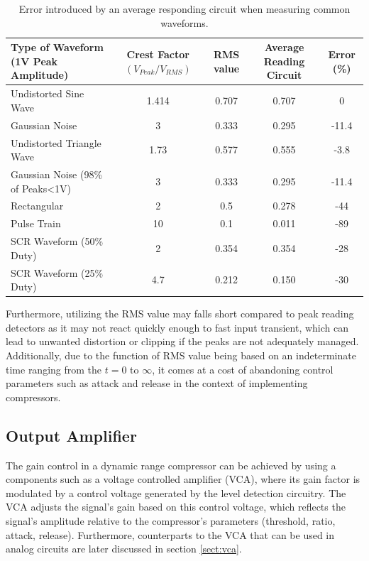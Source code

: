 \documentclass[10pt]{article}
\begin{document}
\begin{multicols*}{2}
                        \begin{table}[!th]
                            \centering
                            \begin{tabularx}{\textwidth}{|l*{4}{|C}|}
                                \hline
                                Type of Waveform (1V Peak Amplitude) & Crest Factor $(V_{Peak}/V_{RMS})$ & RMS value & Average Reading Circuit & Error (\%) \\ \hline
                                Undistorted Sine Wave & 1.414 & 0.707 & 0.707 & 0 \\    \hline
                                Gaussian Noise & 3 & 0.333 & 0.295 & -11.4 \\   \hline
                                Undistorted Triangle Wave & 1.73 & 0.577 & 0.555 & -3.8 \\   \hline
                                Gaussian Noise (98\% of Peaks<1V) & 3 & 0.333 & 0.295 & -11.4 \\    \hline
                                Rectangular & 2 & 0.5 & 0.278 & -44 \\    \hline
                                Pulse Train & 10 & 0.1 & 0.011 & -89 \\    \hline
                                SCR Waveform (50\% Duty) & 2 & 0.354 & 0.354 & -28 \\    \hline
                                SCR Waveform (25\% Duty) & 4.7 & 0.212 & 0.150 & -30 \\    \hline
                            \end{tabularx}
                            \caption{Error introduced by an average responding circuit when measuring common waveforms.}
                            \label{table:ave-err}
                        \end{table}    

                    Furthermore, utilizing the RMS value may falls short compared to peak reading detectors as it may not react quickly enough to fast input transient, which can lead to unwanted distortion or clipping if the peaks are not adequately managed. Additionally, due to the function of RMS value being based on an indeterminate time ranging from the $t=0$ to $\infty$, it comes at a cost of abandoning control parameters such as attack and release in the context of implementing compressors.

            \subsection{Output Amplifier}
                The gain control in a dynamic range compressor can be achieved by using a components such as a voltage controlled amplifier (VCA),  where its gain factor is modulated by a control voltage generated by the level detection circuitry. The VCA adjusts the signal's gain based on this control voltage, which reflects the signal's amplitude relative to the compressor's parameters (threshold, ratio, attack, release). Furthermore, counterparts to the VCA that can be used in analog circuits are later discussed in section \ref{sect:vca}.
        

\end{multicols*}
\end{document}
